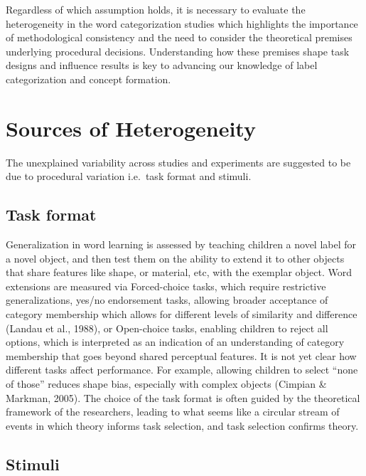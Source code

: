 \documentclass[10pt, letterpaper]{article}
\begin{document}
Regardless of which assumption holds, it is necessary to evaluate the
heterogeneity in the word categorization studies which highlights the
importance of methodological consistency and the need to consider the
theoretical premises underlying procedural decisions. Understanding how
these premises shape task designs and influence results is key to
advancing our knowledge of label categorization and concept formation.

\hypertarget{sources-of-heterogeneity}{%
\section{Sources of Heterogeneity}\label{sources-of-heterogeneity}}

The unexplained variability across studies and experiments are suggested
to be due to procedural variation i.e.~task format and stimuli.

\hypertarget{task-format}{%
\subsection{Task format}\label{task-format}}

Generalization in word learning is assessed by teaching children a novel
label for a novel object, and then test them on the ability to extend it
to other objects that share features like shape, or material, etc, with
the exemplar object. Word extensions are measured via Forced-choice
tasks, which require restrictive generalizations, yes/no endorsement
tasks, allowing broader acceptance of category membership which allows
for different levels of similarity and difference (Landau et al., 1988),
or Open-choice tasks, enabling children to reject all options, which is
interpreted as an indication of an understanding of category membership
that goes beyond shared perceptual features. It is not yet clear how
different tasks affect performance. For example, allowing children to
select ``none of those'' reduces shape bias, especially with complex
objects (Cimpian \& Markman, 2005). The choice of the task format is
often guided by the theoretical framework of the researchers, leading to
what seems like a circular stream of events in which theory informs task
selection, and task selection confirms theory.

\hypertarget{stimuli}{%
\subsection{Stimuli}\label{stimuli}}
\end{document}
